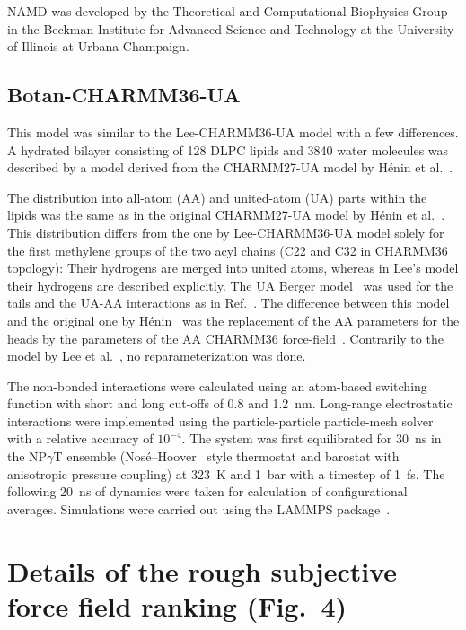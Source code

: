 \documentclass[journal=jacsat,manuscript=article]{achemso}
\begin{document}
NAMD was developed by the Theoretical and Computational Biophysics Group in the
 Beckman Institute for Advanced Science and Technology at the University
 of Illinois at Urbana-Champaign\cite{phillips05}.

\subsection{Botan-CHARMM36-UA}
This model was similar to the Lee-CHARMM36-UA model with a few  differences.
A hydrated bilayer consisting of 128 DLPC lipids and 3840 water
molecules was described by a model derived from the CHARMM27-UA model by H\'enin et al.~\cite{henin08}.

The distribution into all-atom  (AA) and united-atom (UA) parts within the lipids was the same
as in the original CHARMM27-UA model by H\'enin et al.~\cite{henin08}.  
This distribution differs from the one by Lee-CHARMM36-UA model solely
for the first methylene groups of the two acyl chains (C22 and C32 in CHARMM36 topology): 
Their hydrogens are merged into  united atoms, whereas in Lee's model their hydrogens are described explicitly.
The UA Berger model~\cite{berger97} was used for the tails and the UA-AA interactions as in Ref.~. 
The difference between this model and the original one by H\'enin~\cite{henin08} was the replacement of the 
AA parameters for the heads by  the parameters of the AA
 CHARMM36 force-field~\cite{klauda10}. Contrarily to the model by Lee et al.~\cite{lee14}, no reparameterization was done.

The non-bonded interactions were calculated using an atom-based switching function with short and long cut-offs of 0.8 and 1.2~nm. 
Long-range electrostatic interactions were implemented using the particle-particle particle-mesh solver with a relative accuracy of $10^{-4}$. The system 
was first equilibrated for 30~ns in the NP$\gamma$T ensemble (Nos\'{e}--Hoover~\cite{nose84,hoover85} style thermostat and barostat with anisotropic pressure coupling) 
at 323~K and 1~bar with a timestep of 1~fs. The following 20~ns of dynamics were taken for calculation of configurational averages. 
Simulations were carried out using the LAMMPS package~\cite{plimpton95}. %

\pagebreak
\section{Details of the rough subjective force field ranking (Fig.~4)} 
\end{document}
